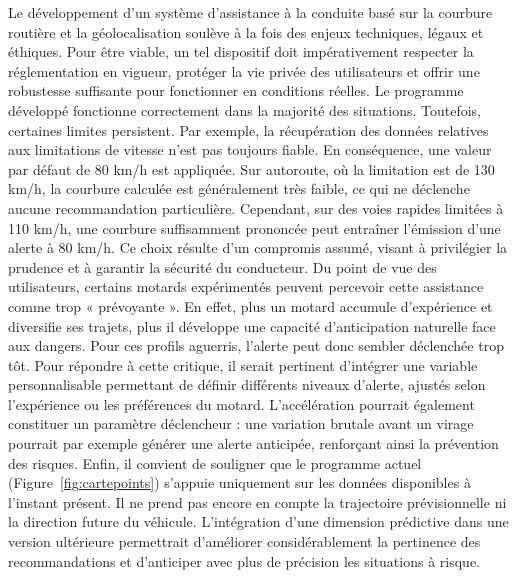Le développement d’un système d’assistance à la conduite basé sur la courbure routière et la géolocalisation soulève à la fois des enjeux techniques, légaux et éthiques. Pour être viable, un tel dispositif doit impérativement respecter la réglementation en vigueur, protéger la vie privée des utilisateurs et offrir une robustesse suffisante pour fonctionner en conditions réelles.
Le programme développé fonctionne correctement dans la majorité des situations. Toutefois, certaines limites persistent. Par exemple, la récupération des données relatives aux limitations de vitesse n’est pas toujours fiable. En conséquence, une valeur par défaut de 80 km/h est appliquée. Sur autoroute, où la limitation est de 130 km/h, la courbure calculée est généralement très faible, ce qui ne déclenche aucune recommandation particulière. Cependant, sur des voies rapides limitées à 110 km/h, une courbure suffisamment prononcée peut entraîner l’émission d’une alerte à 80 km/h. Ce choix résulte d’un compromis assumé, visant à privilégier la prudence et à garantir la sécurité du conducteur.
Du point de vue des utilisateurs, certains motards expérimentés peuvent percevoir cette assistance comme trop « prévoyante ». En effet, plus un motard accumule d’expérience et diversifie ses trajets, plus il développe une capacité d’anticipation naturelle face aux dangers. Pour ces profils aguerris, l’alerte peut donc sembler déclenchée trop tôt.
Pour répondre à cette critique, il serait pertinent d’intégrer une variable personnalisable permettant de définir différents niveaux d’alerte, ajustés selon l’expérience ou les préférences du motard. L’accélération pourrait également constituer un paramètre déclencheur : une variation brutale avant un virage pourrait par exemple générer une alerte anticipée, renforçant ainsi la prévention des risques.
Enfin, il convient de souligner que le programme actuel (Figure~\ref{fig:cartepoints}) s’appuie uniquement sur les données disponibles à l’instant présent. Il ne prend pas encore en compte la trajectoire prévisionnelle ni la direction future du véhicule. L’intégration d’une dimension prédictive dans une version ultérieure permettrait d’améliorer considérablement la pertinence des recommandations et d’anticiper avec plus de précision les situations à risque.